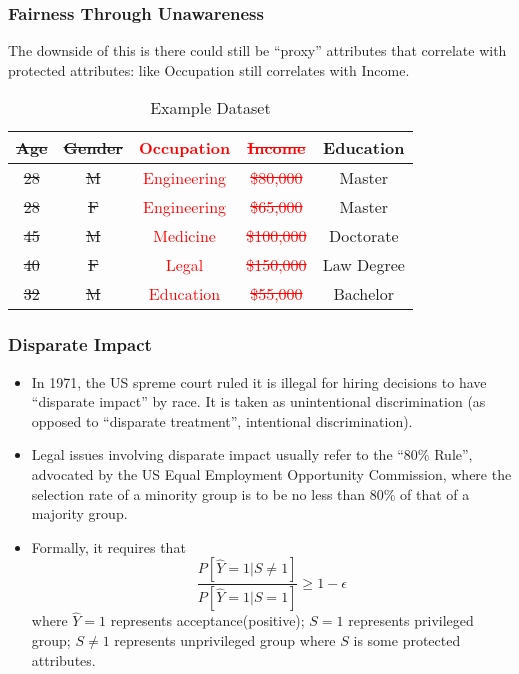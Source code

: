 \documentclass{beamer}
\newcommand{\red}[1]{\textcolor{red}{#1}}
\begin{document}
\begin{frame}
    \frametitle{Fairness Through Unawareness}
    The downside of this is there could still be ``proxy'' attributes
    that correlate with protected attributes: like Occupation still
    correlates with Income.
    \begin{table}
        \begin{tabular}{|c|c|c|c|c|}
            \hline
            \sout{Age} & \sout{Gender}   & \red{Occupation}  & \red{\sout{Income}}   & Education \\
            \hline
            \sout{28} & \sout{M} & \red{Engineering} & \red{\sout{\$80,000}} & Master \\
            \sout{28} & \sout{F} & \red{Engineering} & \red{\sout{\$65,000}} & Master \\
            \sout{45} & \sout{M} & \red{Medicine}    & \red{\sout{\$100,000}} & Doctorate \\
            \sout{40} & \sout{F} & \red{Legal}       & \red{\sout{\$150,000}} & Law Degree \\
            \sout{32} & \sout{M} & \red{Education}   & \red{\sout{\$55,000}} & Bachelor \\
            \hline
        \end{tabular}
        \caption{Example Dataset}
    \end{table}
\end{frame}

\begin{frame}
    \frametitle{Disparate Impact}
    \begin{itemize}
        \item In 1971, the US spreme court ruled it is illegal for hiring decisions to
        have ``disparate impact'' by race. It is taken as unintentional
        discrimination (as opposed to ``disparate treatment'', intentional discrimination).
        \item Legal issues involving disparate impact usually refer to the ``80\% Rule'',
        advocated by the US Equal Employment Opportunity Commission, where the
        selection rate of a minority group is to be no less than 80\% of that of
        a majority group.
        \item Formally, it requires that
        \[
            \frac{P[\hat{Y} = 1 | S \neq 1]}{P[\hat{Y} = 1 | S = 1]} \geq 1 - \epsilon
        \]
        where $\hat{Y} = 1$ represents acceptance(positive);
        $S = 1$ represents privileged group;
        $S \neq 1$ represents unprivileged group where $S$ is some protected
        attributes.
    \end{itemize}
\end{frame}
\end{document}
